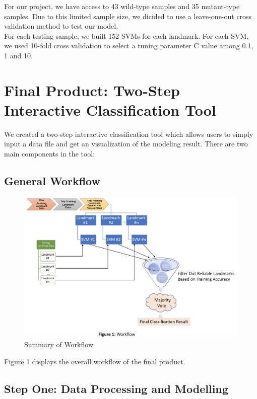 \documentclass[10pt,letterpaper]{article}
\begin{document}
For our project, we have access to 43 wild-type samples and 35
mutant-type samples. Due to this limited sample size, we dicided to use
a leave-one-out cross validation method to test our model.\\
For each testing sample, we built 152 SVMs for each landmark. For each
SVM, we used 10-fold cross validation to select a tuning parameter C
value among 0.1, 1 and 10.

\section{Final Product: Two-Step Interactive Classification
Tool}\label{final-product-two-step-interactive-classification-tool}

We created a two-step interactive classification tool which allows users
to simply input a data file and get an visualization of the modeling
result. There are two main components in the tool:

\subsection{General Workflow}\label{general-workflow}

\begin{figure}[h]
\includegraphics[width=5.55in]{figures/Figure1} \caption{Summary of Workflow}\label{fig:workflow}
\end{figure}

Figure 1 displays the overall workflow of the final product.

\subsection{Step One: Data Processing and
Modelling}\label{step-one-data-processing-and-modelling}
\end{document}

